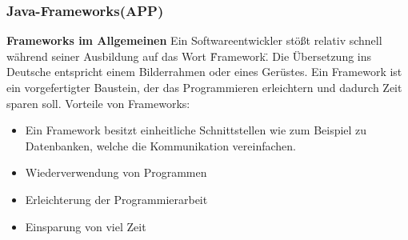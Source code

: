 \clearpage
\subsubsection{Java-Frameworks(APP)}
\textbf{Frameworks im Allgemeinen\newline}
Ein Softwareentwickler stößt relativ schnell während seiner Ausbildung
auf das Wort \"Framework\". Die Übersetzung ins Deutsche entspricht einem Bilderrahmen oder eines Gerüstes.
Ein Framework ist ein vorgefertigter Baustein, der das Programmieren erleichtern und dadurch Zeit sparen soll.
Vorteile von Frameworks:
\begin{itemize}
	\item Ein Framework besitzt einheitliche Schnittstellen wie zum Beispiel zu Datenbanken, welche die Kommunikation vereinfachen. 
	\item Wiederverwendung von Programmen 
	\item Erleichterung der Programmierarbeit
	\item Einsparung von viel Zeit
\end{itemize}

